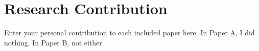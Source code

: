 \section*{Research Contribution}
Enter your personal contribution to each included paper here.
In Paper A, I did nothing.
In Paper B, not either.

